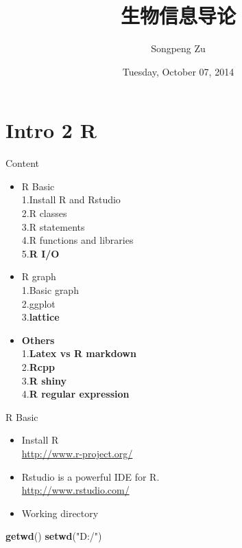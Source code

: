\documentclass[ignorenonframetext,]{beamer}
\title{生物信息导论}
\author{Songpeng Zu}
\date{Tuesday, October 07, 2014}
\newenvironment{Shaded}{\begin{snugshade}}{\end{snugshade}}
\newcommand{\KeywordTok}[1]{\textcolor[rgb]{0.13,0.29,0.53}{\textbf{{#1}}}}
\newcommand{\StringTok}[1]{\textcolor[rgb]{0.31,0.60,0.02}{{#1}}}
\newcommand{\NormalTok}[1]{{#1}}
\begin{document}
\frame{\titlepage}

\begin{frame}
\tableofcontents[hideallsubsections]
\end{frame}

\section{Intro 2 R}\label{intro-2-r}

\begin{frame}{Content}

\begin{itemize}
\itemsep1pt\parskip0pt
\item
  R Basic\\ 1.Install R and Rstudio\\ 2.R classes\\ 3.R statements\\ 4.R
  functions and libraries\\ 5.\textbf{R I/O}
\item
  R graph\\ 1.Basic graph\\ 2.ggplot\\ 3.\textbf{lattice}\\
\item
  \textbf{Others}\\ 1.\textbf{Latex vs R markdown}\\ 2.\textbf{Rcpp}\\
  3.\textbf{R shiny}\\ 4.\textbf{R regular expression}
\end{itemize}

\end{frame}

\begin{frame}[fragile]{R Basic}

\begin{itemize}
\itemsep1pt\parskip0pt
\item
  Install R\\\url{http://www.r-project.org/}\\
\item
  Rstudio is a powerful IDE for R.\\\url{http://www.rstudio.com/}\\
\item
  Working directory
\end{itemize}

\begin{Shaded}
\begin{Highlighting}[]
\KeywordTok{getwd}\NormalTok{()}
\KeywordTok{setwd}\NormalTok{(}\StringTok{"D:/"}\NormalTok{)}
\end{Highlighting}
\end{Shaded}

\end{frame}
\end{document}
